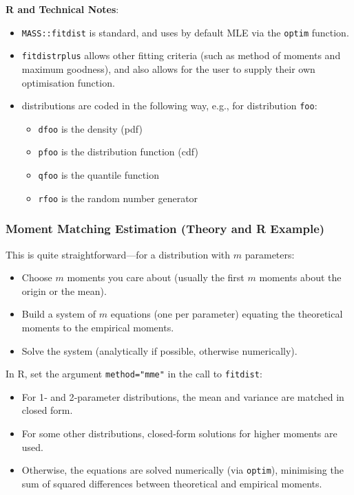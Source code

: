 \documentclass[11pt]{article}
\newcommand{\noi}{\noindent}
\begin{document}
\noi \textbf{R and Technical Notes}:
\begin{itemize}
    \item \texttt{MASS::fitdist} is standard, and uses by default MLE via the \texttt{optim} function.
    \item \texttt{fitdistrplus} allows other fitting criteria (such as method of moments and maximum goodness), and also allows for the user to supply their own optimisation function.
    \item distributions are coded in the following way, e.g., for distribution \texttt{foo}:
        \begin{itemize}
            \item \texttt{dfoo} is the density (pdf)
            \item \texttt{pfoo} is the distribution function (cdf)
            \item \texttt{qfoo} is the quantile function
            \item \texttt{rfoo} is the random number generator
        \end{itemize}
\end{itemize}

\subsubsection{Moment Matching Estimation (Theory and R Example)}
\noi This is quite straightforward—for a distribution with \(m\) parameters:
\begin{itemize}
  \item Choose \(m\) moments you care about (usually the first \(m\) moments about the origin or the mean).
  \item Build a system of \(m\) equations (one per parameter) equating the theoretical moments to the empirical moments.
  \item Solve the system (analytically if possible, otherwise numerically).
\end{itemize}

\noi In R, set the argument \texttt{method="mme"} in the call to \texttt{fitdist}:
\begin{itemize}
  \item For 1‐ and 2‐parameter distributions, the mean and variance are matched in closed form.
  \item For some other distributions, closed‐form solutions for higher moments are used.
  \item Otherwise, the equations are solved numerically (via \texttt{optim}), minimising the sum of squared differences between theoretical and empirical moments.
\end{itemize}
\end{document}
